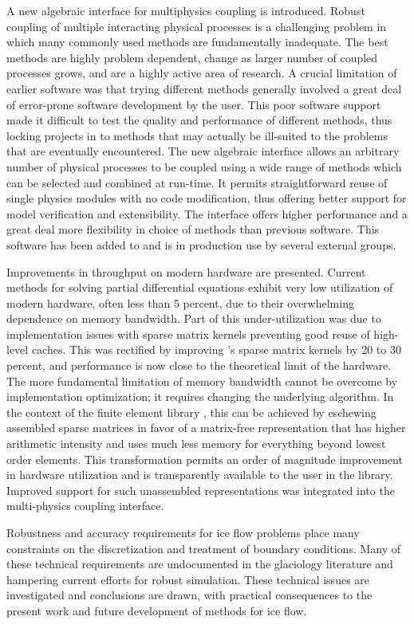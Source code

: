 A new algebraic interface for multiphysics coupling is introduced.
Robust coupling of multiple interacting physical processes is a challenging problem in which many commonly used methods are fundamentally inadequate.
The best methods are highly problem dependent, change as larger number of coupled processes grows, and are a highly active area of research.
A crucial limitation of earlier software was that trying different methods generally involved a great deal of error-prone software development by the user.
This poor software support made it difficult to test the quality and performance of different methods, thus locking projects in to methods that may actually be ill-suited to the problems that are eventually encountered.
The new algebraic interface allows an arbitrary number of physical processes to be coupled using a wide range of methods which can be selected and combined at run-time.
It permits straightforward reuse of single physics modules with no code modification, thus offering better support for model verification and extensibility.
The interface offers higher performance and a great deal more flexibility in choice of methods than previous software.
This software has been added to {\PETSc} and is in production use by several external groups.

Improvements in throughput on modern hardware are presented.
Current methods for solving partial differential equations exhibit very low utilization of modern hardware, often less than 5 percent, due to their overwhelming dependence on memory bandwidth.
Part of this under-utilization was due to implementation issues with sparse matrix kernels preventing good reuse of high-level caches.
This was rectified by improving \PETSc's sparse matrix kernels by 20 to 30 percent, and performance is now close to the theoretical limit of the hardware.
The more fundamental limitation of memory bandwidth cannot be overcome by implementation optimization; it requires changing the underlying algorithm.
In the context of the finite element library \Dohp, this can be achieved by eschewing assembled sparse matrices in favor of a matrix-free representation that has higher arithmetic intensity and uses much less memory for everything beyond lowest order elements.
This transformation permits an order of magnitude improvement in hardware utilization and is transparently available to the user in the {\Dohp} library.
Improved support for such unassembled representations was integrated into the multi-physics coupling interface.

Robustness and accuracy requirements for ice flow problems place many constraints on the discretization and treatment of boundary conditions.
Many of these technical requirements are undocumented in the glaciology literature and hampering current efforts for robust simulation.
These technical issues are investigated and conclusions are drawn, with practical consequences to the present work and future development of methods for ice flow.

